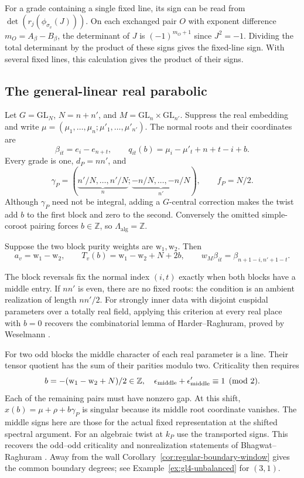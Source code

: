 \documentclass[12pt]{amsart}
\numberwithin{equation}{section}
\theoremstyle{plain}
\theoremstyle{definition}
\theoremstyle{remark}
\newcommand{\GL}{\mathrm{GL}}
\newcommand{\Z}{\mathbb{Z}}
\begin{document}
For a grade containing a single fixed line, its sign can be read from $\det(r_j(\phi_{\sigma_v}(J)))$. On each exchanged pair $O$ with exponent difference $m_O=A_\beta-B_\beta$, the determinant of $J$ is $(-1)^{m_O+1}$ since $J^2=-1$. Dividing the total determinant by the product of these signs gives the fixed-line sign. With several fixed lines, this calculation gives the product of their signs.

\subsection{The general-linear real parabolic}\label{subsec:gl-real}
Let $G=\GL_N$, $N=n+n'$, and $M=\GL_n\times\GL_{n'}$. Suppress the real embedding and write $\mu=(\mu_1,\ldots,\mu_n;\mu'_1,\ldots,\mu'_{n'})$. The normal roots and their coordinates are \begin{equation}\label{eq:gl-coordinates}
 \beta_{it}=e_i-e_{n+t},\qquad
 q_{it}(b)=\mu_i-\mu'_t+n+t-i+b.
\end{equation}
Every grade is one, $d_P=nn'$, and 
\[
 \gamma_P=(\underbrace{n'/N,\ldots,n'/N}_{n};
            \underbrace{-n/N,\ldots,-n/N}_{n'}),\qquad
 f_P=N/2.
\]
Although $\gamma_P$ need not be integral, adding a $G$-central correction makes the twist add $b$ to the first block and zero to the second. Conversely the omitted simple-coroot pairing forces $b\in\Z$, so $\Lambda_{\mathrm{alg}}=\Z$. 

Suppose the two block purity weights are $\mathrm{w}_1,\mathrm{w}_2$. Then
\[
 a_v=\mathrm{w}_1-\mathrm{w}_2,\qquad
 T_v(b)=\mathrm{w}_1-\mathrm{w}_2+N+2b,\qquad
 w_M\beta_{it}=\beta_{n+1-i,n'+1-t}.
\]

The block reversals fix the normal index $(i,t)$ exactly when both blocks have a middle entry. If $nn'$ is even, there are no fixed roots: the condition is an ambient realization of length $nn'/2$. For strongly inner data with disjoint cuspidal parameters over a totally real field, applying this criterion at every real place with $b=0$ recovers the combinatorial lemma of Harder--Raghuram, proved by Weselmann \cite[Lemma~7.14 and \S\S~7.2.4.]{HarderRaghuram2020}.

For two odd blocks the middle character of each real parameter is a line. Their tensor quotient has the sum of their parities modulo two. Criticality then requires 
\[
 b=-(\mathrm{w}_1-\mathrm{w}_2+N)/2\in\Z,\quad
 \epsilon_{\rm middle}+\epsilon'_{\rm middle}\equiv1\pmod2.
\]
Each of the remaining pairs must have nonzero gap. At this shift, \(x(b)=\mu+\rho+b\gamma_P\) is singular because its middle root coordinate vanishes. The middle signs here are those for the actual fixed representation at the shifted spectral argument. For an algebraic twist at $k_P$ use the transported signs. This recovers the odd--odd criticality and nonrealization statements of Bhagwat--Raghuram \cite[Lemma~7.14 and \S7.2.4]{HarderRaghuram2020}. Away from the wall Corollary~\ref{cor:regular-boundary-window} gives the common boundary degrees; see Example~\ref{ex:gl4-unbalanced} for $(3,1)$. 
\end{document}
